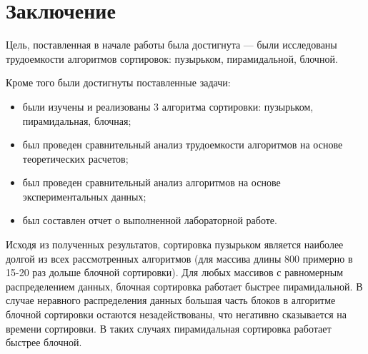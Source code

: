 \chapter*{Заключение}



Цель, поставленная в начале работы была достигнута --- были исследованы трудоемкости алгоритмов сортировок: пузырьком, пирамидальной, блочной. 

Кроме того были достигнуты поставленные задачи:
\begin{itemize}
	\item были изучены и реализованы 3 алгоритма сортировки: пузырьком, пирамидальная, блочная;
	\item был проведен сравнительный анализ трудоемкости алгоритмов на основе теоретических расчетов;
	\item был проведен сравнительный анализ алгоритмов на основе экспериментальных данных;
	\item был составлен отчет о выполненной лабораторной работе.
\end{itemize}

Исходя из полученных результатов, сортировка пузырьком является наиболее долгой из всех рассмотренных алгоритмов (для массива длины 800 примерно в 15-20 раз дольше блочной сортировки). Для любых массивов с равномерным распределением данных, блочная сортировка работает быстрее пирамидальной. В случае неравного распределения данных большая часть блоков в алгоритме блочной сортировки остаются незадействованы, что негативно сказывается на времени сортировки. В таких случаях пирамидальная сортировка работает быстрее блочной.